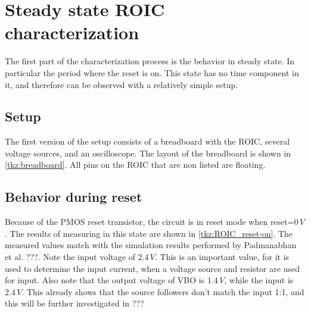 \section{Steady state ROIC characterization}\label{sec:steady_state_ROIC_characerization}
The first part of the characterization process is the behavior in steady state. In particular the period where the reset is on. This state has no time component in it, and therefore can be observed with a relatively simple setup.

\subsection{Setup}\label{ssec:steady_state_setup}
The first version of the setup consists of a breadboard with the ROIC, several voltage sources, and an oscilloscope. The layout of the breadboard is shown in \cref{tkz:breadboard}. All pins on the ROIC that are non listed are floating.



\subsection{Behavior during reset}

Because of the PMOS reset transistor, the circuit is in reset mode when reset=$0\,V$. The results of measuring in this state are shown in \cref{tkz:ROIC_reset-on}. The measured values match with the simulation results performed by Padmanabhan et al. ???. Note the input voltage of $2.4\,V$. This is an important value, for it is used to determine the input current, when a voltage source and resistor are used for input. Also note that the output voltage of VBO is $1.4\,V$, while the input is $2.4\,V$. This already shows that the source followers don't match the input 1:1, and this will be further investigated in ???

